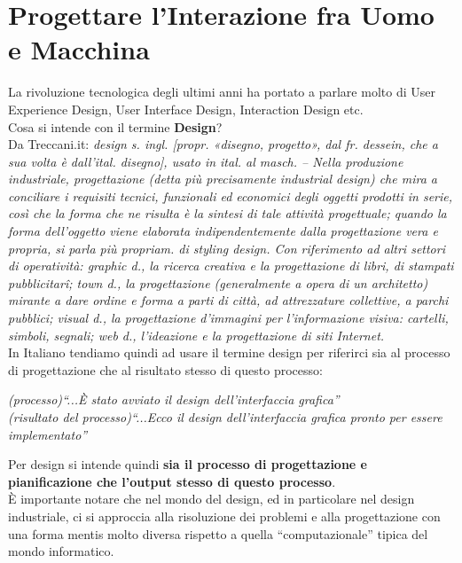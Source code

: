 \chapter{Progettare l'Interazione fra Uomo e Macchina}

La rivoluzione tecnologica degli ultimi anni ha portato a parlare molto di User Experience Design, User Interface Design, Interaction Design etc.\\ 

Cosa si intende con il termine \textbf{Design}?\\

Da Treccani.it: \textit{design s. ingl. [propr. «disegno, progetto», dal fr. dessein, che a sua volta è dall’ital. disegno], usato in ital. al masch. – Nella produzione industriale, progettazione (detta più precisamente industrial design) che mira a conciliare i requisiti tecnici, funzionali ed economici degli oggetti prodotti in serie, così che la forma che ne risulta è la sintesi di tale attività progettuale; quando la forma dell’oggetto viene elaborata indipendentemente dalla progettazione vera e propria, si parla più propriam. di styling design. Con riferimento ad altri settori di operatività: graphic d., la ricerca creativa e la progettazione di libri, di stampati pubblicitarî; town d., la progettazione (generalmente a opera di un architetto) mirante a dare ordine e forma a parti di città, ad attrezzature collettive, a parchi pubblici; visual d., la progettazione d’immagini per l’informazione visiva: cartelli, simboli, segnali; web d., l’ideazione e la progettazione di siti Internet.}\\

In Italiano tendiamo quindi ad usare il termine design per riferirci sia al processo di progettazione che al risultato stesso di questo processo:

\begin{flushleft}
    \textit{(processo)``...È stato avviato il design dell'interfaccia grafica''}\\
    \textit{(risultato del processo)``...Ecco il design dell'interfaccia grafica pronto per essere implementato''}\\
\end{flushleft}


 Per design si intende quindi \textbf{sia il processo di progettazione e pianificazione che l'output stesso di questo processo}. \\
 
 È importante notare che nel mondo del design, ed in particolare nel design industriale, ci si approccia alla risoluzione dei problemi e alla progettazione con una forma mentis molto diversa rispetto a quella ``computazionale'' tipica del mondo informatico.
 
